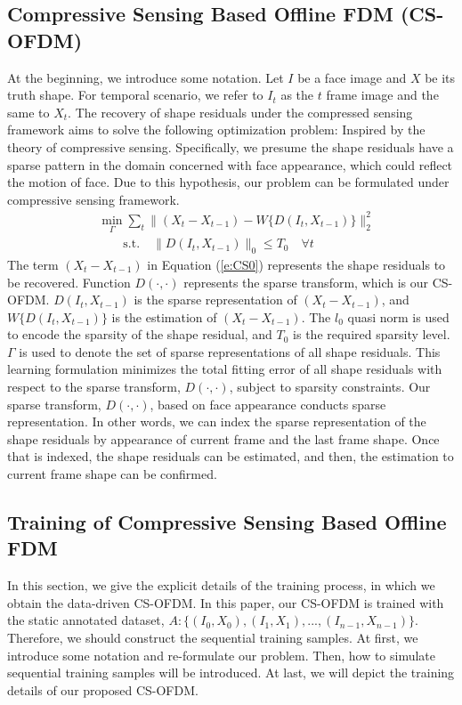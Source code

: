 \documentclass[a4paper, 10pt, conference]{ieeeconf}      %
\begin{document}
\subsection{Compressive Sensing Based Offline FDM (CS-OFDM)}
At the beginning, we introduce some notation.
Let $I$ be a face image and $X$ be its truth shape. For temporal scenario, we refer to $I_t$ as the $t$ frame image and the same to $X_t$.
The recovery of shape residuals under the compressed sensing framework aims to solve the following optimization problem:
Inspired by the theory of compressive sensing. Specifically, we presume the shape residuals have a sparse pattern in the domain concerned with
face appearance, which could reflect the motion of face. Due to this hypothesis, our problem can be formulated under compressive sensing framework.
\begin{equation}
\label{e:CS0}
	\begin{split}
        &\min_{\Gamma} \sum_{t}{\|(X_{t} - X_{t-1}) - W\{D(I_{t},X_{t-1})\}\|_2^2}\\
        &\quad\quad \text{s.t.}\quad \|D(I_{t},X_{t-1})\|_0 \leq T_0 \quad \forall t
	\end{split}
\end{equation}
The term $(X_{t} - X_{t-1})$ in Equation (\ref{e:CS0}) represents the shape residuals to be recovered. Function $D(\cdot,\cdot)$
represents the sparse transform, which is our CS-OFDM. $D(I_t,X_{t-1})$ is the sparse representation of $(X_{t} - X_{t-1})$, and $W\{D(I_{t},X_{t-1})\}$ is the estimation
of $(X_{t} - X_{t-1})$. The $l_0$ quasi norm is used to encode the sparsity of the shape residual, and $T_0$ is the
required sparsity level. $\Gamma$ is used to denote the set of sparse representations of all shape residuals. This learning formulation minimizes
the total fitting error of all shape residuals with respect to the sparse transform, $D(\cdot,\cdot)$, subject to sparsity constraints.
Our sparse transform, $D(\cdot,\cdot)$, based on face appearance conducts sparse representation. In other words, we can index the sparse
representation of the shape residuals by appearance of current frame and the last frame shape. Once that is indexed, the shape residuals can be 
estimated, and then, the estimation to current frame shape can be confirmed.

\subsection{Training of Compressive Sensing Based Offline FDM}
In this section, we give the explicit details of the training process, in which we obtain the data-driven CS-OFDM. In this paper, our CS-OFDM is
trained with the static annotated dataset, $A:\{(I_0,X_0), (I_1,X_1), ... , (I_{n-1},X_{n-1})\}$. Therefore, we should construct the sequential
training samples. At first, we introduce some notation and re-formulate our problem. Then, how to simulate sequential training samples will be
introduced. At last, we will depict the training details of our proposed CS-OFDM.
\end{document}
